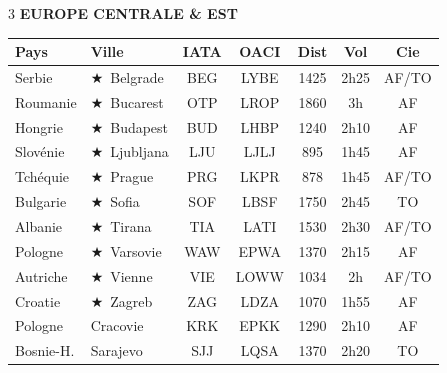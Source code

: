 \documentclass[9pt,a4paper,landscape]{article}
\newcommand{\CAP}{\textcolor{capgold}{$\bigstar$}}
\begin{document}
\begin{multicols}{3}
\vspace{0.15cm}
\textbf{\color{eurblue}EUROPE CENTRALE \& EST}\\[-0.1cm]
\begin{tabular}{@{}l l c c c c c@{}}
\toprule
\textbf{Pays} & \textbf{Ville} & \textbf{IATA} & \textbf{OACI} & \textbf{Dist} & \textbf{Vol} & \textbf{Cie} \\
\midrule
\rowcolor{eurlight} Serbie & \CAP\ Belgrade & BEG & LYBE & 1425 & 2h25 & AF/TO \\
Roumanie & \CAP\ Bucarest & OTP & LROP & 1860 & 3h & AF \\
\rowcolor{eurlight} Hongrie & \CAP\ Budapest & BUD & LHBP & 1240 & 2h10 & AF \\
Slovénie & \CAP\ Ljubljana & LJU & LJLJ & 895 & 1h45 & AF \\
\rowcolor{eurlight} Tchéquie & \CAP\ Prague & PRG & LKPR & 878 & 1h45 & AF/TO \\
Bulgarie & \CAP\ Sofia & SOF & LBSF & 1750 & 2h45 & TO \\
\rowcolor{eurlight} Albanie & \CAP\ Tirana & TIA & LATI & 1530 & 2h30 & AF/TO \\
Pologne & \CAP\ Varsovie & WAW & EPWA & 1370 & 2h15 & AF \\
\rowcolor{eurlight} Autriche & \CAP\ Vienne & VIE & LOWW & 1034 & 2h & AF/TO \\
Croatie & \CAP\ Zagreb & ZAG & LDZA & 1070 & 1h55 & AF \\
\rowcolor{eurlight} Pologne & Cracovie & KRK & EPKK & 1290 & 2h10 & AF \\
Bosnie-H. & Sarajevo & SJJ & LQSA & 1370 & 2h20 & TO \\
\bottomrule
\end{tabular}


\end{multicols}
\end{document}
